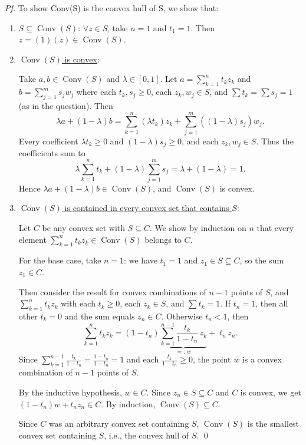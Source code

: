 \documentclass[a4paper]{article}
\begin{document}
\textit{Pf.} To show Conv(S) is the convex hull of S, we show that:
\begin{enumerate}
\item \underline{$S \subseteq \operatorname{Conv}(S)$}:
$\forall z \in S$, take $n = 1$ and $t_1 = 1$. Then $z = (1)(z) \in \operatorname{Conv}(S)$.

\item \underline{$\operatorname{Conv}(S)$ is convex}: 

Take $a, b \in \operatorname{Conv}(S)$ and $\lambda \in [0,1]$. Let $a = \sum_{k=1}^{n} t_k z_k$ and $b = \sum_{j=1}^{m} s_j w_j$ where each $t_k, s_j \geq 0$, each $z_k, w_j \in S$, and $\sum t_k = \sum s_j = 1$ (as in the question). Then
\[
\lambda a + (1 - \lambda) b = \sum_{k=1}^{n} (\lambda t_k) z_k + \sum_{j=1}^{m} ((1-\lambda) s_j) w_j.
\]
Every coefficient $\lambda t_k \geq 0$ and $(1-\lambda) s_j \geq 0$, and each $z_k, w_j \in S$. Thus the coefficients sum to
\[
\lambda \sum_{k=1}^{n} t_k + (1 - \lambda) \sum_{j=1}^{m} s_j = \lambda + (1 - \lambda) = 1.
\]
Hence $\lambda a + (1-\lambda) b \in \operatorname{Conv}(S)$, and $\operatorname{Conv}(S)$ is convex.

\item \underline{$\operatorname{Conv}(S)$ is contained in every convex set that contains $S$}:

Let $C$ be any convex set with $S \subseteq C$. We show by induction on $n$ that every element $\sum_{k=1}^{n} t_k z_k \in \operatorname{Conv}(S)$ belongs to $C$.

For the base case, take $n = 1$: we have $t_1 = 1$ and $z_1 \in S \subseteq C$, so the sum $z_1 \in C$.

Then consider the result for convex combinations of $n - 1$ points of $S$, and $\sum_{k=1}^{n} t_k z_k$ with each $t_k \geq 0$, each $z_k \in S$, and $\sum t_k = 1$. If $t_n = 1$, then all other $t_k = 0$ and the sum equals $z_n \in C$. Otherwise $t_n < 1$, then
\[
\sum_{k=1}^{n} t_k z_k = (1 - t_n) \underbrace{\sum_{k=1}^{n-1} \frac{t_k}{1 - t_n}\, z_k}_{=:\, w} + \; t_n \, z_n.
\]
Since $\sum_{k=1}^{n-1} \frac{t_k}{1 - t_n} = \frac{1 - t_n}{1 - t_n} = 1$ and each $\frac{t_k}{1 - t_n} \geq 0$, the point $w$ is a convex combination of $n-1$ points of $S$. 

By the inductive hypothesis, $w \in C$. Since $z_n \in S \subseteq C$ and $C$ is convex, we get $(1 - t_n) w + t_n z_n \in C$. By induction, $\operatorname{Conv}(S) \subseteq C$.

Since $C$ was an arbitrary convex set containing $S$, $\operatorname{Conv}(S)$ is the smallest convex set containing $S$, i.e., the convex hull of $S$. \qed
\end{enumerate}
\end{document}
